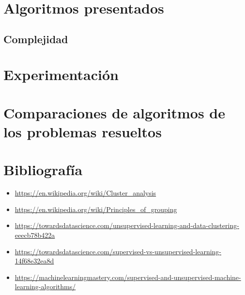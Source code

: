 \documentclass[8pt,a4paper]{article}
\begin{document}
\section{Algoritmos presentados}
\subsection{Complejidad}
\section{Experimentación}

\section{Comparaciones de algoritmos de los problemas resueltos}

\section{Bibliografía}
\begin{itemize}
	\item \url{https://en.wikipedia.org/wiki/Cluster_analysis}
	\item \url{https://en.wikipedia.org/wiki/Principles_of_grouping}
	\item \url{https://towardsdatascience.com/unsupervised-learning-and-data-clustering-eeecb78b422a}
	\item \url{https://towardsdatascience.com/supervised-vs-unsupervised-learning-14f68e32ea8d}
	\item \url{https://machinelearningmastery.com/supervised-and-unsupervised-machine-learning-algorithms/}
\end{itemize}
\end{document}
